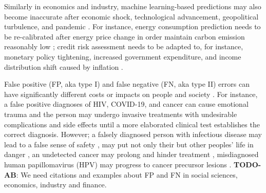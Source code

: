 \documentclass{article}
\newcommand{\todo}[2]{{\color{red} {\bf TODO-#1}: #2}}
\begin{document}
Similarly in economics and industry, machine learning-based predictions may also become inaccurate after economic shock, technological advancement, geopolitical turbulence, and pandemic \cite{ramey2016macroeconomic}. For instance, energy consumption prediction needs to be re-calibrated after energy price change in order maintain carbon emission reasonably low \cite{clement2023coping}; credit risk assessment needs to be adapted to, for instance, monetary policy tightening, increased government expenditure, and income distribution shift caused by inflation \cite{kritzman2012regime,guo2023predict}.

False positive (FP, aka type I) and false negative (FN, aka type II) errors can have significantly different costs or impacts on people and society \cite{wynants2019three}. For instance, a false positive diagnoses of HIV, COVID-19, and cancer can cause emotional trauma and the person may undergo invasive treatments with undesirable complications and side effects \cite{newman2021rate, salz2010meta, Tosteson2014Consequences, xu2016frequency} until a more elaborated clinical test establishes the correct diagnosis. However; a falsely diagnosed person with infectious disease may lead to a false sense of safety \cite{mouliou2021false}, may put not only their but other peoples' life in danger \cite{woloshin2020false}, an undetected cancer may prolong and hinder treatment \cite{bradley2021interpreting}, misdiagnosed human papillomavirus (HPV) may progress to cancer precursor lesions \cite{macios2022false,pinsky2015principles}. \todo{AB}{We need citations and examples about FP and FN in social sciences, economics, industry and finance}.

\end{document}
